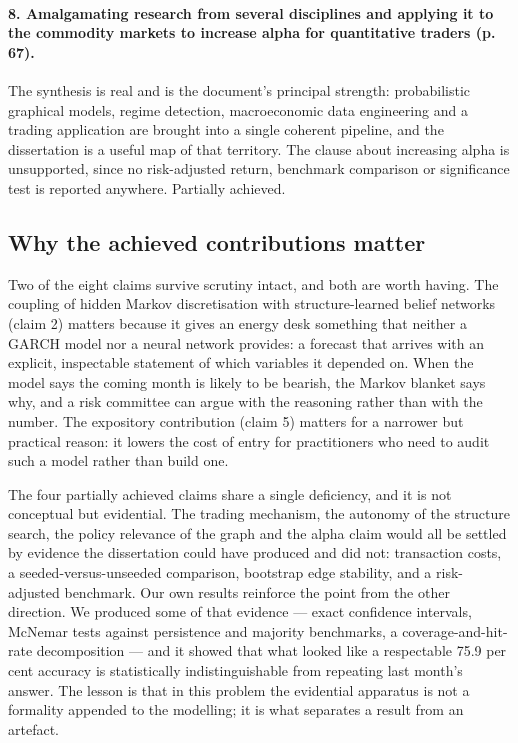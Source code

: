 \documentclass[11pt,a4paper]{article}
\begin{document}
\paragraph{8. Amalgamating research from several disciplines and applying it to the commodity
markets to increase alpha for quantitative traders (p. 67).} The synthesis is real and is the
document's principal strength: probabilistic graphical models, regime detection, macroeconomic
data engineering and a trading application are brought into a single coherent pipeline, and the
dissertation is a useful map of that territory. The clause about increasing alpha is unsupported,
since no risk-adjusted return, benchmark comparison or significance test is reported anywhere.
Partially achieved.

\subsection{Why the achieved contributions matter}

Two of the eight claims survive scrutiny intact, and both are worth having. The coupling of hidden
Markov discretisation with structure-learned belief networks (claim 2) matters because it gives an
energy desk something that neither a GARCH model nor a neural network provides: a forecast that
arrives with an explicit, inspectable statement of which variables it depended on. When the model
says the coming month is likely to be bearish, the Markov blanket says why, and a risk committee
can argue with the reasoning rather than with the number. The expository contribution (claim 5)
matters for a narrower but practical reason: it lowers the cost of entry for practitioners who need
to audit such a model rather than build one.

The four partially achieved claims share a single deficiency, and it is not conceptual but
evidential. The trading mechanism, the autonomy of the structure search, the policy relevance of
the graph and the alpha claim would all be settled by evidence the dissertation could have
produced and did not: transaction costs, a seeded-versus-unseeded comparison, bootstrap edge
stability, and a risk-adjusted benchmark. Our own results reinforce the point from the other
direction. We produced some of that evidence --- exact confidence intervals, McNemar tests against
persistence and majority benchmarks, a coverage-and-hit-rate decomposition --- and it showed that
what looked like a respectable 75.9 per cent accuracy is statistically indistinguishable from
repeating last month's answer. The lesson is that in this problem the evidential apparatus is not a
formality appended to the modelling; it is what separates a result from an artefact.
\end{document}
